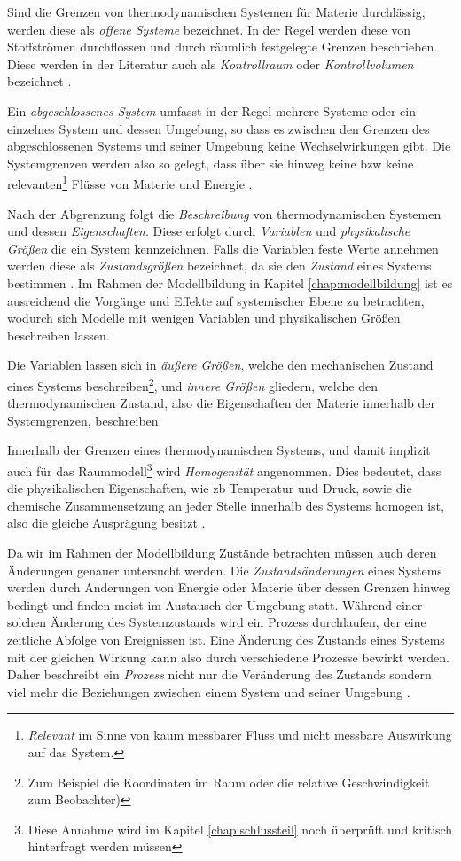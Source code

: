 Sind die Grenzen von thermodynamischen Systemen für Materie durchlässig, werden diese als \textit{offene Systeme} bezeichnet. In der Regel werden diese von Stoffströmen durchflossen und durch räumlich festgelegte Grenzen beschrieben. Diese werden in der Literatur auch als \textit{Kontrollraum} oder \textit{Kontrollvolumen} bezeichnet \cite[S.~12]{ba12}.

Ein \textit{abgeschlossenes System} umfasst in der Regel mehrere Systeme oder ein einzelnes System und dessen Umgebung, so dass es zwischen den Grenzen des abgeschlossenen Systems und seiner Umgebung keine Wechselwirkungen gibt. Die Systemgrenzen werden also so gelegt, dass über sie hinweg keine \acrlong{bzw} keine relevanten\footnote{\textit{Relevant} im Sinne von kaum messbarer Fluss und nicht messbare Auswirkung auf das System.} Flüsse von Materie und Energie \cite[S.~13]{ba12}.

Nach der Abgrenzung folgt die \textit{Beschreibung} von thermodynamischen Systemen und dessen \textit{Eigenschaften}. Diese erfolgt durch \textit{Variablen} und \textit{physikalische Größen} die ein System kennzeichnen. Falls die Variablen feste Werte annehmen werden diese als \textit{Zustandsgrößen} bezeichnet, da sie den \textit{Zustand} eines Systems bestimmen \cite[S.~13]{ba12}. Im Rahmen der Modellbildung in Kapitel \ref{chap:modellbildung} ist es ausreichend die Vorgänge und Effekte auf systemischer Ebene zu betrachten, wodurch sich Modelle mit wenigen Variablen und physikalischen Größen beschreiben lassen.

Die Variablen lassen sich in \textit{äußere Größen}, welche den mechanischen Zustand eines Systems beschreiben\footnote{Zum Beispiel die Koordinaten im Raum oder die relative Geschwindigkeit zum Beobachter)}, und \textit{innere Größen} gliedern, welche den thermodynamischen Zustand, also die Eigenschaften der Materie innerhalb der Systemgrenzen, beschreiben\cite[S.13~f.]{ba12}.

Innerhalb der Grenzen eines thermodynamischen Systems, und damit implizit auch für das Raummodell\footnote{Diese Annahme wird im Kapitel \ref{chap:schlussteil} noch überprüft und kritisch hinterfragt werden müssen} wird \textit{Homogenität} angenommen. Dies bedeutet, dass die physikalischen Eigenschaften, wie \acrlong{zb} Temperatur und Druck, sowie die chemische Zusammensetzung an jeder Stelle innerhalb des Systems homogen ist, also die gleiche Ausprägung besitzt \cite[S.15]{ba12}.

Da wir im Rahmen der Modellbildung Zustände betrachten müssen auch deren Änderungen genauer untersucht werden. Die \textit{Zustandsänderungen} eines Systems werden durch Änderungen von Energie oder Materie über dessen Grenzen hinweg bedingt und finden meist im Austausch der Umgebung statt. Während einer solchen Änderung des Systemzustands wird ein Prozess durchlaufen, der eine zeitliche Abfolge von Ereignissen ist. Eine Änderung des Zustands eines Systems mit der gleichen Wirkung kann also durch verschiedene Prozesse bewirkt werden. Daher beschreibt ein \textit{Prozess} nicht nur die Veränderung des Zustands sondern viel mehr die Beziehungen zwischen einem System und seiner Umgebung \cite[S.21~f.]{ba12}.

